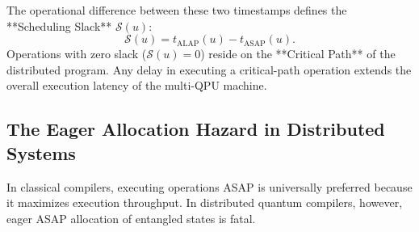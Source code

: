 The operational difference between these two timestamps defines the **Scheduling Slack** $\mathcal{S}(u)$:
\begin{equation}
    \mathcal{S}(u) = t_{\text{ALAP}}(u) - t_{\text{ASAP}}(u).
    \label{eq:slack_definition}
\end{equation}
Operations with zero slack ($\mathcal{S}(u) = 0$) reside on the **Critical Path** of the distributed program. Any delay in executing a critical-path operation extends the overall execution latency of the multi-QPU machine.

\subsection{The Eager Allocation Hazard in Distributed Systems}
In classical compilers, executing operations ASAP is universally preferred because it maximizes execution throughput. In distributed quantum compilers, however, eager ASAP allocation of entangled states is fatal.

